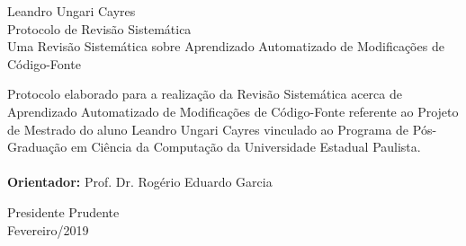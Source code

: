 \begin{center}
	
\vspace*{44pt}
{\Large Leandro Ungari Cayres}\\

\vspace*{70pt}
{\Large Protocolo de Revisão Sistemática}\\

\vspace*{75pt}
{\Large Uma Revisão Sistemática sobre Aprendizado Automatizado de Modificações de Código-Fonte}\\

\end{center}

\vspace*{85pt}

\begin{flushright}
\begin{minipage}{9cm}
{\large Protocolo elaborado para a realização da Revisão
Sistemática acerca de Aprendizado Automatizado de Modificações de Código-Fonte referente ao Projeto de Mestrado do aluno Leandro Ungari Cayres vinculado ao Programa de Pós-Graduação em Ciência da Computação da
Universidade Estadual Paulista.\\ 
\textbf{\\Orientador:} Prof. Dr. Rogério Eduardo Garcia
}
\end{minipage}
\end{flushright}

\vspace{\fill}
\begin{center}
{\large Presidente Prudente \\Fevereiro/2019}\\
\end{center}